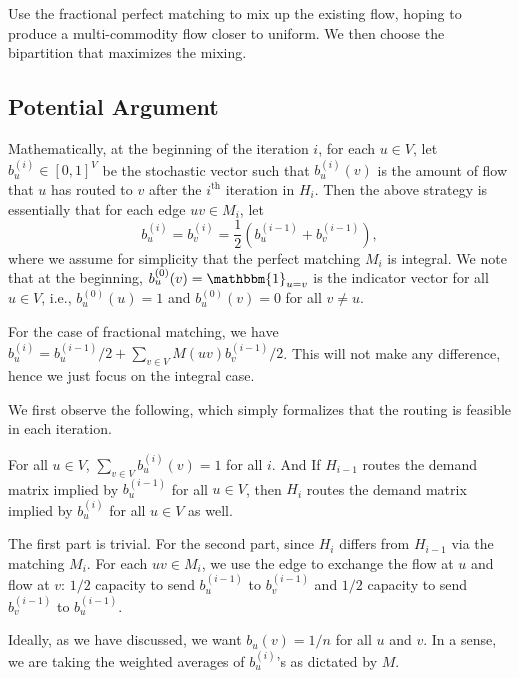 \begin{intuition}
	Use the fractional perfect matching to mix up the existing flow, hoping to produce a multi-commodity flow closer to uniform. We then choose the bipartition that maximizes the mixing.
\end{intuition}

\subsection{Potential Argument}
Mathematically, at the beginning of the iteration \(i\), for each \(u \in V\), let \(b_u^{(i)} \in [0, 1]^V\) be the stochastic vector such that \(b_u^{(i)}(v)\) is the amount of flow that \(u\) has routed to \(v\) after the \(i^{\text{th} }\) iteration in \(H_i\). Then the above strategy is essentially that for each edge \(uv \in M_i\), let
\[
	b_u^{(i)}
	= b_v^{(i)}
	= \frac{1}{2} (b_u^{(i-1)} + b_v^{(i-1)}),
\]
where we assume for simplicity that the perfect matching \(M_i\) is integral. We note that at the beginning, \(b_u^{(0)}(v) = \mathbbm{1}_{u = v} \) is the indicator vector for all \(u \in V\), i.e., \(b_u^{(0)}(u) = 1\) and \(b_u^{(0)}(v) = 0\) for all \(v \neq u\).

\begin{note}
	For the case of fractional matching, we have \(b_u^{(i)} = b_u^{(i-1)} / 2 + \sum_{v \in V} M(uv) b_v^{(i-1)} / 2\). This will not make any difference, hence we just focus on the integral case.
\end{note}

We first observe the following, which simply formalizes that the routing is feasible in each iteration.

\begin{claim}
	For all \(u \in V\), \(\sum_{v \in V} b_u^{(i)}(v) = 1\) for all \(i\). And If \(H_{i-1}\) routes the demand matrix implied by \(b_u^{(i-1)}\) for all \(u \in V\), then \(H_i\) routes the demand matrix implied by \(b_u^{(i)}\) for all \(u \in V\) as well.
\end{claim}
\begin{explanation}
	The first part is trivial. For the second part, since \(H_i\) differs from \(H_{i-1}\) via the matching \(M_i\). For each \(uv \in M_i\), we use the edge to exchange the flow at \(u\) and flow at \(v\): \(1 / 2\) capacity to send \(b_u^{(i-1)}\) to \(b_v^{(i-1)}\) and \(1 / 2\) capacity to send \(b_v^{(i-1)}\) to \(b_u^{(i-1)}\).
\end{explanation}

Ideally, as we have discussed, we want \(b_u(v) = 1 / n\) for all \(u\) and \(v\). In a sense, we are taking the weighted averages of \(b_u^{(i)}\)'s as dictated by \(M\).


